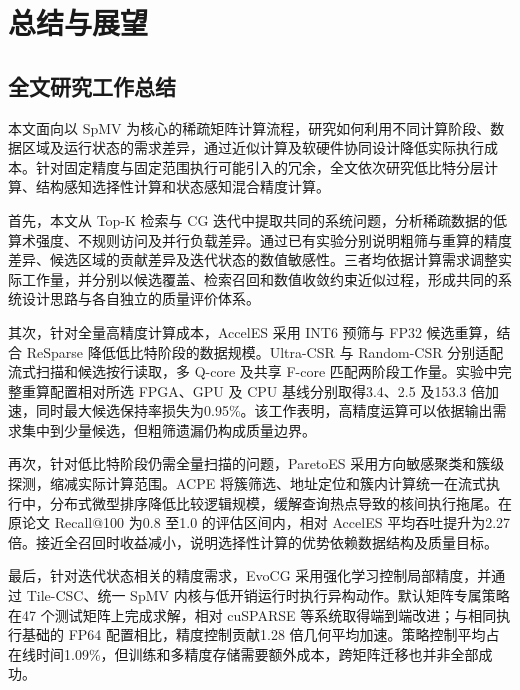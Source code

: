 \chapter{总结与展望}\label{chap:conclusion}
\section{全文研究工作总结}
本文面向以 SpMV 为核心的稀疏矩阵计算流程，研究如何利用不同计算阶段、数据区域及运行状态的需求差异，通过近似计算及软硬件协同设计降低实际执行成本。针对固定精度与固定范围执行可能引入的冗余，全文依次研究低比特分层计算、结构感知选择性计算和状态感知混合精度计算。

首先，本文从 Top-K 检索与 CG 迭代中提取共同的系统问题，分析稀疏数据的低算术强度、不规则访问及并行负载差异。通过已有实验分别说明粗筛与重算的精度差异、候选区域的贡献差异及迭代状态的数值敏感性。三者均依据计算需求调整实际工作量，并分别以候选覆盖、检索召回和数值收敛约束近似过程，形成共同的系统设计思路与各自独立的质量评价体系。

其次，针对全量高精度计算成本，AccelES 采用 INT6 预筛与 FP32 候选重算，结合 ReSparse 降低低比特阶段的数据规模。Ultra-CSR 与 Random-CSR 分别适配流式扫描和候选按行读取，多 Q-core 及共享 F-core 匹配两阶段工作量。实验中完整重算配置相对所选 FPGA、GPU 及 CPU 基线分别取得3.4、2.5 及153.3 倍加速，同时最大候选保持率损失为0.95\%。该工作表明，高精度运算可以依据输出需求集中到少量候选，但粗筛遗漏仍构成质量边界。

再次，针对低比特阶段仍需全量扫描的问题，ParetoES 采用方向敏感聚类和簇级探测，缩减实际计算范围。ACPE 将簇筛选、地址定位和簇内计算统一在流式执行中，分布式微型排序降低比较逻辑规模，\hbalance{}缓解查询热点导致的核间执行拖尾。在原论文 Recall@100 为0.8 至1.0 的评估区间内，相对 AccelES 平均吞吐提升为2.27 倍。接近全召回时收益减小，说明选择性计算的优势依赖数据结构及质量目标。

最后，针对迭代状态相关的精度需求，EvoCG 采用强化学习控制局部精度，并通过 Tile-CSC、统一 SpMV 内核与低开销运行时执行异构动作。默认矩阵专属策略在47 个测试矩阵上完成求解，相对 cuSPARSE 等系统取得端到端改进；与相同执行基础的 FP64 配置相比，精度控制贡献1.28 倍几何平均加速。策略控制平均占在线时间1.09\%，但训练和多精度存储需要额外成本，跨矩阵迁移也并非全部成功。

